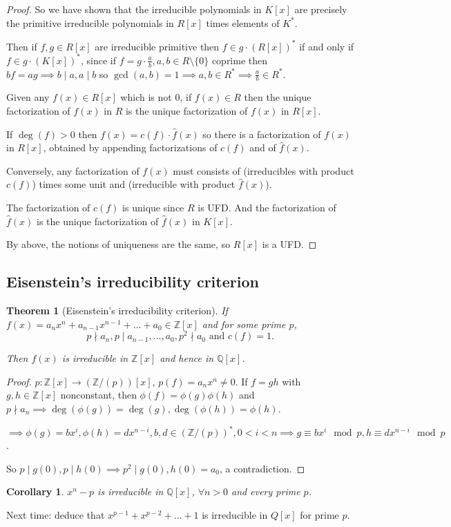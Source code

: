 \documentclass{article}
\newcommand{\Z}{\mathbb{Z}}
\newcommand{\Q}{\mathbb{Q}}
\newtheorem*{theorem}{Theorem}
\newtheorem*{corollary}{Corollary}
\theoremstyle{definition}
\theoremstyle{remark}
\begin{document}
\begin{proof}
    So we have shown that the irreducible polynomials in $K[x]$ are precisely the primitive irreducible polynomials in $R[x]$ times elements of $K^*$.

    Then if $f, g \in R[x]$ are irreducible primitive then $f \in g\cdot(R[x])^*$ if and only if $f \in g\cdot(K[x])^*$, since if $f = g \cdot \frac{a}{b}, a, b \in R \setminus \{0\}$ coprime then $bf = ag \implies b \mid a, a \mid b$ so $\gcd(a, b) = 1 \implies a, b \in R^* \implies \frac{a}{b} \in R^*$.

    Given any $f(x) \in R[x]$ which is not $0$, if $f(x) \in R$ then the unique factorization of $f(x)$ in $R$ is the unique factorization of $f(x)$ in $R[x]$.

    If $\deg(f) > 0$ then $f(x) = c(f) \cdot \hat{f}(x)$ so there is a factorization of $f(x)$ in $R[x]$, obtained by appending factorizations of $c(f)$ and of $\hat{f}(x)$.

    Conversely, any factorization of $f(x)$ must consists of (irreducibles with product $c(f)$) times some unit and (irreducible with product $\hat{f}(x)$).

    The factorization of $c(f)$ is unique since $R$ is UFD. And the factorization of $\hat{f}(x)$ is the unique factorization of $\hat{f}(x)$ in $K[x]$.

    By above, the notions of uniqueness are the same, so $R[x]$ is a UFD.
\end{proof}

\subsection*{Eisenstein's irreducibility criterion}
\begin{theorem}[Eisenstein's irreducibility criterion]
    If $f(x) = a_nx^n + a_{n-1}x^{n-1} + \ldots + a_0 \in \Z[x]$ and for some prime $p$, \[p \nmid a_n, p \mid a_{n-1}, \ldots, a_0, p^2 \nmid a_0 \text{ and } c(f) = 1.\] 
    
    Then $f(x)$ is irreducible in $\Z[x]$ and hence in $\Q[x]$.
\end{theorem}
\begin{proof}
    $p:\Z[x] \to (\Z/(p))[x]$, $p(f) = a_nx^n \neq 0$. If $f = gh$ with $g, h \in \Z[x]$ nonconstant, then $\phi(f) = \phi(g)\phi(h)$ and $p \nmid a_n \implies \deg(\phi(g)) = \deg(g), \deg(\phi(h)) = \phi(h)$.

    $\implies \phi(g) = bx^i, \phi(h) = dx^{n-i}, b, d \in (\Z/(p))^*, 0 < i < n \implies g \equiv bx^i \mod p, h \equiv dx^{n-i} \mod p$.

    So $p \mid g(0), p \mid h(0) \implies p^2 \mid g(0), h(0) = a_0$, a contradiction.
\end{proof}

\begin{corollary}
    $x^n - p$ is irreducible in $\Q[x]$, $\forall n > 0$ and every prime $p$.
\end{corollary}

Next time: deduce that $x^{p - 1} + x^{p - 2} + \ldots + 1$ is irreducible in $Q[x]$ for prime $p$. 
\end{document}

